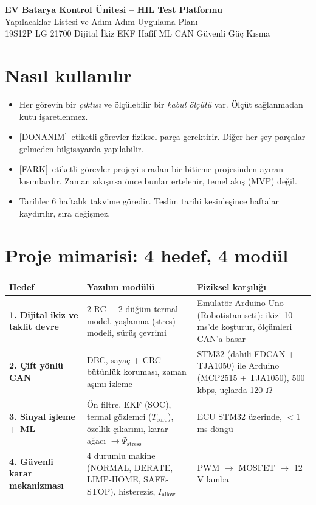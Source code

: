 \documentclass[11pt,a4paper]{article}
\newcommand{\donanim}{\textcolor{uyari}{\small[DONANIM]}\ }
\newcommand{\artı}{\textcolor{ana}{\small[FARK]}\ }
\begin{document}
\begin{center}
{\LARGE\bfseries\color{ana} EV Batarya Kontrol Ünitesi -- HIL Test Platformu}\\[4pt]
{\large Yapılacaklar Listesi ve Adım Adım Uygulama Planı}\\[4pt]
{\small 19S12P LG 21700 Dijital İkiz \textbullet{} EKF \textbullet{} Hafif ML \textbullet{} CAN \textbullet{} Güvenli Güç Kısma}
\end{center}

\section*{Nasıl kullanılır}
\begin{itemize}[leftmargin=1.2em,itemsep=1pt]
  \item Her görevin bir \textit{çıktısı} ve ölçülebilir bir \textit{kabul ölçütü} var. Ölçüt sağlanmadan kutu işaretlenmez.
  \item \donanim etiketli görevler fiziksel parça gerektirir. Diğer her şey parçalar gelmeden bilgisayarda yapılabilir.
  \item \artı etiketli görevler projeyi sıradan bir bitirme projesinden ayıran kısımlardır. Zaman sıkışırsa önce bunlar ertelenir, temel akış (MVP) değil.
  \item Tarihler 6 haftalık takvime göredir. Teslim tarihi kesinleşince haftalar kaydırılır, sıra değişmez.
\end{itemize}

\section{Proje mimarisi: 4 hedef, 4 modül}

\begin{center}
\renewcommand{\arraystretch}{1.25}
\begin{tabularx}{\textwidth}{>{\bfseries}p{3.2cm}X X}
\toprule
Hedef & Yazılım modülü & Fiziksel karşılığı \\
\midrule
1. Dijital ikiz ve taklit devre & 2-RC + 2 düğüm termal model, yaşlanma (stres) modeli, sürüş çevrimi & Emülatör Arduino Uno (Robotistan seti): ikizi 10 ms'de koşturur, ölçümleri CAN'a basar \\
2. Çift yönlü CAN & DBC, sayaç + CRC bütünlük koruması, zaman aşımı izleme & STM32 (dahili FDCAN + TJA1050) ile Arduino (MCP2515 + TJA1050), 500 kbps, uçlarda 120 $\Omega$ \\
3. Sinyal işleme + ML & Ön filtre, EKF (SOC), termal gözlemci ($T_\text{core}$), özellik çıkarımı, karar ağacı $\rightarrow \Psi_\text{stress}$ & ECU STM32 üzerinde, $<1$ ms döngü \\
4. Güvenli karar mekanizması & 4 durumlu makine (NORMAL, DERATE, LIMP-HOME, SAFE-STOP), histerezis, $I_\text{allow}$ & PWM $\rightarrow$ MOSFET $\rightarrow$ 12 V lamba \\
\bottomrule
\end{tabularx}
\end{center}
\end{document}
